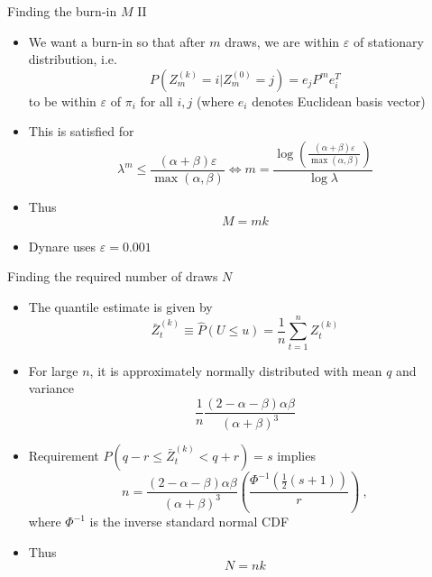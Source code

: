 \begin{frame}{Finding the burn-in $M$ II}
\begin{itemize}
    \item We want a burn-in so that after $m$ draws, we are within $\varepsilon$ of stationary distribution, i.e.
    \begin{equation}
    P\left(Z_m^{(k)}=i|Z_m^{(0)}=j\right)=e_jP^me_i^T
    \end{equation}
    to be within $\varepsilon$ of $\pi_i$ for all $i,j$ (where $e_i$ denotes Euclidean basis vector)
    \item This is satisfied for
    \begin{equation}
    {\lambda ^m} \leqslant \frac{{\left( {\alpha  + \beta } \right)\varepsilon }}{{\max \left( {\alpha ,\beta } \right)}} \Leftrightarrow m = \frac{{\log \left( {\frac{{\left( {\alpha  + \beta } \right)\varepsilon }}{{\max \left( {\alpha ,\beta } \right)}}} \right)}}{{\log \lambda }}
    \end{equation}
    \item Thus
    \begin{equation}
      M=mk
    \end{equation}
    \item Dynare uses $\varepsilon=0.001$
\end{itemize}
\end{frame}

\begin{frame}{Finding the required number of draws $N$}
\begin{itemize}
    \item The quantile estimate is given by
    \begin{equation}
    {\bar{Z}}_t^{\left( k \right)}\equiv \hat P\left( {U \leqslant u} \right) = \frac{1}{n}\sum\limits_{t = 1}^n {Z_t^{\left( k \right)}}
    \end{equation}
    \item For large $n$, it is approximately normally distributed with mean $q$ and variance
    \begin{equation}
    \frac{1}{n}\frac{{\left( {2 - \alpha  - \beta } \right)\alpha \beta }}{{{{\left( {\alpha  + \beta } \right)}^3}}}
    \end{equation}
    \item Requirement $P\left(q-r \leq {\bar{Z}}_t^{\left( k \right)} < q+r \right)=s$ implies
    \begin{equation}
    n = \frac{{\left( {2 - \alpha  - \beta } \right)\alpha \beta }}{{{{\left( {\alpha  + \beta } \right)}^3}}}\left( {\frac{{{\Phi ^{ - 1}}\left( {\frac{1}{2}\left( {s + 1} \right)} \right)}}{r}} \right) \: ,
    \end{equation}
    where $\Phi^{ - 1}$ is the inverse standard normal CDF
    \item Thus
    \begin{equation}
    N=nk
    \end{equation}
\end{itemize}
\end{frame}



